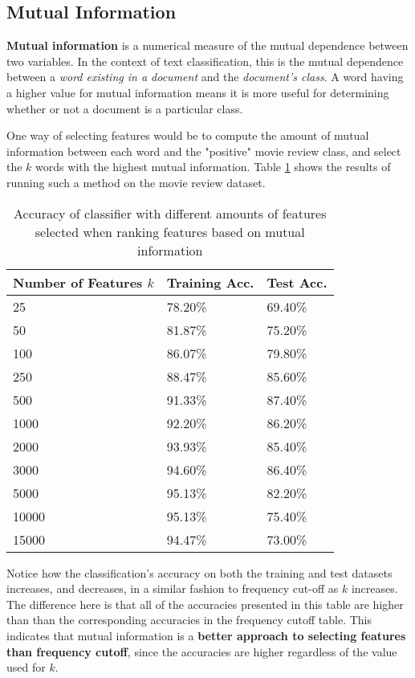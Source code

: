 \documentclass{article}
\begin{document}
\subsection{Mutual Information}

\textbf{Mutual information} is a numerical measure of the mutual dependence between two variables. In the context of text classification, this is the mutual dependence between a \textit{word existing in a document} and the \textit{document's class}. A word having a higher value for mutual information means it is more useful for determining whether or not a document is a particular class.

One way of selecting features would be to compute the amount of mutual information between each word and the "positive" movie review class, and select the $k$ words with the highest mutual information. Table \ref{tab:mutual_information} shows the results of running such a method on the movie review dataset. 

\begin{table}
	\centering
	\begin{tabular}{|l|l|l|}
	\hline
	\textbf{Number of Features $k$} & \textbf{Training Acc.} & \textbf{Test Acc.} \\
	\hline
	25 & 78.20\% & 69.40\% \\
	50 & 81.87\% & 75.20\% \\
	100 & 86.07\% & 79.80\% \\
	250 & 88.47\% & 85.60\% \\
	500 & 91.33\% & 87.40\% \\
	1000 & 92.20\% & 86.20\% \\
	2000 & 93.93\% & 85.40\% \\
	3000 & 94.60\% & 86.40\% \\
	5000 & 95.13\% & 82.20\% \\
	10000 & 95.13\% & 75.40\% \\
	15000 & 94.47\% & 73.00\% \\
	\hline
	\end{tabular}
	\caption{Accuracy of classifier with different amounts of features selected when ranking features based on mutual information}
	\label{tab:mutual_information}
\end{table}

Notice how the classification's accuracy on both the training and test datasets increases, and decreases, in a similar fashion to frequency cut-off as $k$ increases. The difference here is that all of the accuracies presented in this table are higher than than the corresponding accuracies in the frequency cutoff table. This indicates that mutual information is a \textbf{better approach to selecting features than frequency cutoff}, since the accuracies are higher regardless of the value used for $k$.
\end{document}
